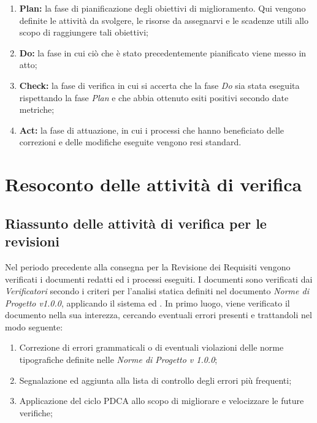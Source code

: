 \documentclass[openany,12pt,a4paper]{report}
\begin{document}
\begin{enumerate}
    \item \textbf{Plan:} la fase di pianificazione degli obiettivi di miglioramento. Qui vengono definite le attività da svolgere, le risorse da assegnarvi e le scadenze utili allo scopo di raggiungere tali obiettivi;
    \item \textbf{Do:} la fase in cui ciò che è stato precedentemente pianificato viene messo in atto;
    \item \textbf{Check:} la fase di verifica in cui si accerta che la fase \textit{Do} sia stata eseguita rispettando la fase \textit{Plan} e che abbia ottenuto esiti positivi secondo date metriche;
    \item \textbf{Act:} la fase di attuazione, in cui i processi che hanno beneficiato delle correzioni e delle modifiche eseguite vengono resi standard.
\end{enumerate}


\chapter{Resoconto delle attività di verifica}

\section{Riassunto delle attività di verifica per le revisioni}

Nel periodo precedente alla consegna per la Revisione dei Requisiti vengono verificati i documenti redatti ed i processi eseguiti. I documenti sono verificati dai \textit{Verificatori} secondo i criteri per l'analisi statica definiti nel documento \textit{Norme di Progetto v1.0.0}, applicando il sistema  ed . In primo luogo, viene verificato il documento nella sua interezza, cercando eventuali errori presenti e trattandoli nel modo seguente:

\begin{enumerate}
    \item Correzione di errori grammaticali o di eventuali violazioni delle norme tipografiche definite nelle \textit{Norme di Progetto v 1.0.0};
    \item  Segnalazione ed aggiunta alla lista di controllo degli errori più frequenti;
    \item Applicazione del ciclo PDCA allo scopo di migliorare e velocizzare le future verifiche;
\end{enumerate}
\end{document}
